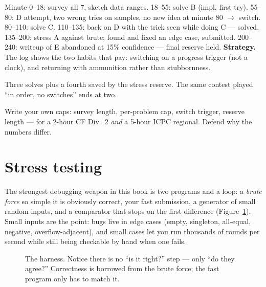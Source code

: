 \begin{example}
Minute 0--18: survey all 7, sketch data ranges. 18--55: solve
B (impl, first try). 55--80: D attempt, two wrong tries on
samples, no new idea at minute 80 $\to$ switch. 80--110: solve
C. 110--135: back on D with the trick seen while doing C ---
solved. 135--200: stress A against brute; found and fixed an
edge case, submitted. 200--240: writeup of E abandoned at 15\%
confidence --- final reserve held.
\textbf{Strategy.} The log shows the two habits that pay:
switching on a progress trigger (not a clock), and returning
with ammunition rather than stubbornness.
\end{example}
\begin{solution}
Three solves plus a fourth saved by the stress reserve. The
same contest played ``in order, no switches'' ends at two.
\end{solution}

\begin{exercise}[medium] Write your own caps: survey length,
per-problem cap, switch trigger, reserve length --- for a 2-hour
CF Div.~2 \emph{and} a 5-hour ICPC regional. Defend why the
numbers differ.\end{exercise}

\section{Stress testing}\label{sec:stress}
The strongest debugging weapon in this book is two programs
and a loop: a \emph{brute force} so simple it is obviously
correct, your fast submission, a generator of small random
inputs, and a comparator that stops on the first difference
(Figure~\ref{fig:stress}). Small inputs are the point: bugs
live in edge cases (empty, singleton, all-equal, negative,
overflow-adjacent), and small cases let you run thousands of
rounds per second while still being checkable by hand when one
fails.
\begin{figure}[ht]\centering

\caption{The harness. Notice there is no ``is it right?''
step --- only ``do they agree?'' Correctness is borrowed from
the brute force; the fast program only has to match it.}
\label{fig:stress}
\end{figure}

